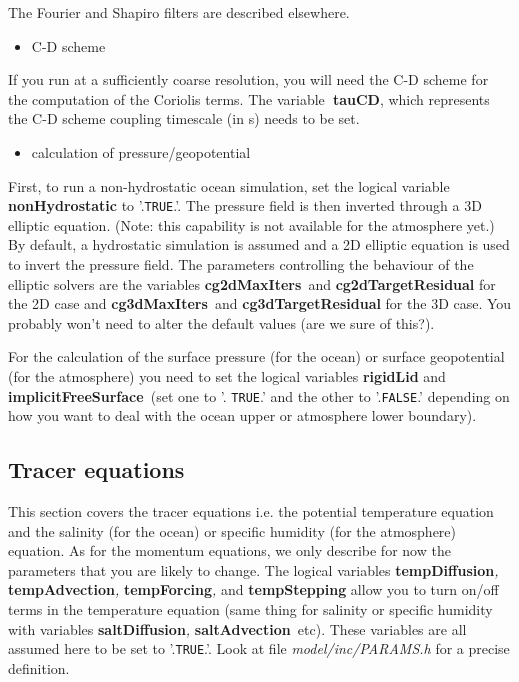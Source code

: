 The Fourier and Shapiro filters are described elsewhere.

\begin{itemize}
\item C-D scheme
\end{itemize}

If you run at a sufficiently coarse resolution, you will need the C-D scheme
for the computation of the Coriolis terms. The variable\textbf{\ tauCD},
which represents the C-D scheme coupling timescale (in s) needs to be set.

\begin{itemize} 
\item calculation of pressure/geopotential
\end{itemize} 

First, to run a non-hydrostatic ocean simulation, set the logical variable 
\textbf{nonHydrostatic} to '.\texttt{TRUE}.'. The pressure field is then
inverted through a 3D elliptic equation. (Note: this capability is not
available for the atmosphere yet.) By default, a hydrostatic simulation is
assumed and a 2D elliptic equation is used to invert the pressure field. The
parameters controlling the behaviour of the elliptic solvers are the
variables \textbf{cg2dMaxIters}\textit{\ }and \textbf{cg2dTargetResidual }%
for the 2D case and \textbf{cg3dMaxIters}\textit{\ }and \textbf{%
cg3dTargetResidual }for the 3D case. You probably won't need to alter the
default values (are we sure of this?).

For the calculation of the surface pressure (for the ocean) or surface
geopotential (for the atmosphere) you need to set the logical variables 
\textbf{rigidLid} and \textbf{implicitFreeSurface}\textit{\ }(set one to '.%
\texttt{TRUE}.' and the other to '.\texttt{FALSE}.' depending on how you
want to deal with the ocean upper or atmosphere lower boundary).

\subsection{Tracer equations}

This section covers the tracer equations i.e. the potential temperature
equation and the salinity (for the ocean) or specific humidity (for the
atmosphere) equation. As for the momentum equations, we only describe for
now the parameters that you are likely to change. The logical variables 
\textbf{tempDiffusion}\textit{, }\textbf{tempAdvection}\textit{, }\textbf{%
tempForcing}\textit{,} and \textbf{tempStepping} allow you to turn on/off
terms in the temperature equation (same thing for salinity or specific
humidity with variables \textbf{saltDiffusion}\textit{, }\textbf{%
saltAdvection}\textit{\ }etc). These variables are all assumed here to be
set to '.\texttt{TRUE}.'. Look at file \textit{model/inc/PARAMS.h }for a
precise definition.

